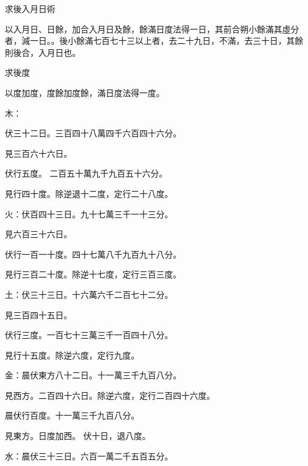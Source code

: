 \begin{pinyinscope}
 求後入月日術



 以入月日、日餘，加合入月日及餘，餘滿日度法得一日，其前合朔小餘滿其虛分者，減一日。。後小餘滿七百七十三以上者，去二十九日，不滿，去三十日，其餘則後合，入月日也。



 求後度



 以度加度，度餘加度餘，滿日度法得一度。



 木：



 伏三十二日。三百四十八萬四千六百四十六分。



 見三百六十六日。



 伏行五度。
 二百五十萬九千九百五十六分。



 見行四十度。除逆退十二度，定行二十八度。



 火：伏百四十三日。九十七萬三千一十三分。



 見六百三十六日。



 伏行一百一十度。四十七萬八千九百九十八分。



 見行三百二十度。除逆十七度，定行三百三度。



 土：伏三十三日。十六萬六千二百七十二分。



 見三百四十五日。



 伏行三度。一百七十三萬三千一百四十八分。



 見行十五度。除逆六度，定行九度。



 金：晨伏東方八十二日。十一萬三千九百八分。



 見西方。二百四十六日。除逆六度，定行二百四十六度。



 晨伏行百度。十一萬三千九百八分。



 見東方。日度加西。
 伏十日，退八度。



 水：晨伏三十三日。六百一萬二千五百五分。




\end{pinyinscope}
